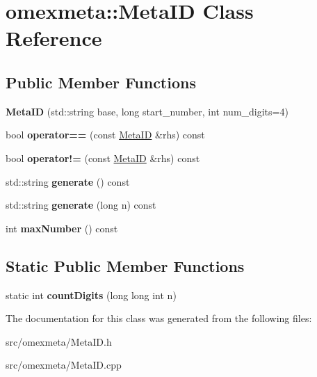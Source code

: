 \hypertarget{classomexmeta_1_1MetaID}{}\section{omexmeta\+:\+:Meta\+ID Class Reference}
\label{classomexmeta_1_1MetaID}
\subsection*{Public Member Functions}
\begin{DoxyCompactItemize}
\item 
\mbox{\label{classomexmeta_1_1MetaID_af5cc076ccd6db8c411de98902d2a1218}} 
{\bfseries Meta\+ID} (std\+::string base, long start\+\_\+number, int num\+\_\+digits=4)
\item 
\mbox{\label{classomexmeta_1_1MetaID_a3d6466efca8d9e931ca8c440c0809584}} 
bool {\bfseries operator==} (const \hyperlink{classomexmeta_1_1MetaID}{Meta\+ID} \&rhs) const
\item 
\mbox{\label{classomexmeta_1_1MetaID_a25af693b284b0110914c537b48b20937}} 
bool {\bfseries operator!=} (const \hyperlink{classomexmeta_1_1MetaID}{Meta\+ID} \&rhs) const
\item 
\mbox{\label{classomexmeta_1_1MetaID_a95e709df9b0ee47473bc40012738cdc8}} 
std\+::string {\bfseries generate} () const
\item 
\mbox{\label{classomexmeta_1_1MetaID_a9a3c9b479d522e7630275d85582edd26}} 
std\+::string {\bfseries generate} (long n) const
\item 
\mbox{\label{classomexmeta_1_1MetaID_a343f4b48c9673f8943e03057370f01e4}} 
int {\bfseries max\+Number} () const
\end{DoxyCompactItemize}
\subsection*{Static Public Member Functions}
\begin{DoxyCompactItemize}
\item 
\mbox{\label{classomexmeta_1_1MetaID_ae4fe83a3512f64065e8e2997bc710be6}} 
static int {\bfseries count\+Digits} (long long int n)
\end{DoxyCompactItemize}


The documentation for this class was generated from the following files\+:\begin{DoxyCompactItemize}
\item 
src/omexmeta/Meta\+I\+D.\+h\item 
src/omexmeta/Meta\+I\+D.\+cpp\end{DoxyCompactItemize}
